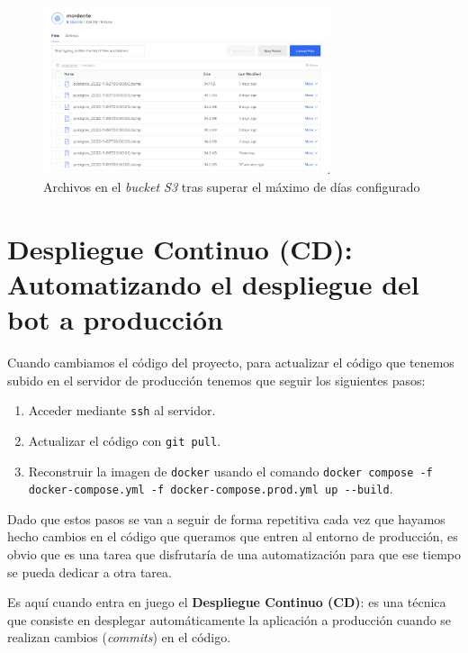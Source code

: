 \begin{figure}[h]
\centering
\includegraphics[width=0.75\textwidth]{imagenes/implementacion/backup_despues_borrado_automatico.png}
\caption{Archivos en el \textit{bucket S3} tras superar el máximo de días configurado}
\label{fig:backup2}
\end{figure}




\section{Despliegue Continuo (CD): Automatizando el despliegue del bot a producción}



Cuando cambiamos el código del proyecto, para actualizar el código que tenemos subido en el servidor de producción tenemos que seguir los siguientes pasos:

\begin{enumerate}
    \item Acceder mediante \texttt{ssh} al servidor.
    \item Actualizar el código con \texttt{git pull}.
    \item Reconstruir la imagen de \texttt{docker} usando el comando \texttt{docker compose -f docker-compose.yml -f docker-compose.prod.yml up -{}-build}.
\end{enumerate}

Dado que estos pasos se van a seguir de forma repetitiva cada vez que hayamos hecho cambios en el código que queramos que entren al entorno de producción, es obvio que es una tarea que disfrutaría de una automatización para que ese tiempo se pueda dedicar a otra tarea.

Es aquí cuando entra en juego el \textbf{Despliegue Continuo (CD)}: es una técnica que consiste en desplegar automáticamente la aplicación a producción cuando se realizan cambios (\textit{commits}) en el código\cite{Shahin_2017}. 

